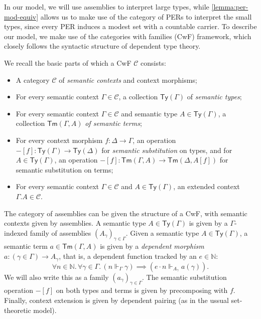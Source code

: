 \documentclass[10pt,a4paper]{article}
\theoremstyle{definition}
\theoremstyle{remark}
\renewcommand{\.}{.\,} %
\renewcommand{\:}{:} %
\newcommand{\bN}{\mathbb{N}}
\newcommand{\C}{\mathcal C}
\newcommand{\0}{\mathbf{0}}
\newcommand{\1}{\mathbf{1}}
\newcommand\<\langle
\renewcommand\>\rangle
\newcommand\bb\mathbb
\newcommand{\Ty}{\mathsf{Ty}}
\newcommand{\Tm}{\mathsf{Tm}}
\theoremstyle{remark}
\begin{document}
In our model, we will use assemblies to interpret large types, while \autoref{lemma:per-mod-equiv} allows us to make use of the category of PERs to interpret the small types, since every PER induces a modest set with a countable carrier. 
To describe our model, we make use of the categories with families (CwF) framework, which closely follows the syntactic structure of dependent type theory.

We recall the basic parts of which a CwF \( \mathcal{C} \) consists:  
\begin{itemize}
    \item A category \( \C \) of \emph{semantic contexts} and context morphisms;
    \item For every semantic context \( \Gamma \in \C \), a collection \( \Ty(\Gamma) \) of \emph{semantic types};
    \item For every semantic context \( \Gamma \in \C \) and semantic type \( A \in \Ty(\Gamma) \), a collection \( \Tm(\Gamma, A) \) \emph{of semantic terms};
    \item For every context morphism $f : \Delta \to \Gamma$, an operation $-[f] : \Ty(\Gamma) \to \Ty(\Delta)$ for \emph{semantic substitution} on types, and for $A \in \Ty(\Gamma)$, an operation $-[f] : \Tm(\Gamma, A) \to \Tm(\Delta, A[f])$ for semantic substitution on terms;
    \item For every semantic context $\Gamma \in \C$ and $A \in \Ty(\Gamma)$, an extended context $\Gamma.A \in \C$. 
\end{itemize}

The category of assemblies can be given the structure of a CwF, with semantic contexts given by assemblies. A semantic type \( A \in \Ty(\Gamma) \) is given by a \( \Gamma \)-indexed family of assemblies \( (A_\gamma)_{\gamma \in \Gamma} \). Given a semantic type \( A \in \Ty(\Gamma) \), a semantic term \( a \in \Tm(\Gamma, A) \) is given by a \emph{dependent morphism} \( a : (\gamma \in \Gamma) \to A_\gamma \), that is, a dependent function tracked by an \(e\in\bb N\): 
\[
    \forall n \in \bN.\,\forall \gamma \in \Gamma \. (n\Vdash_\Gamma \gamma) \implies (e\cdot n\Vdash_{A_\gamma}a(\gamma)).
\]
We will also write this as a family \( (a_\gamma)_{\gamma \in \Gamma} \). The semantic substitution operation $-[f]$ on both types and terms is given by precomposing with $f$. Finally, context extension is given by dependent pairing (as in the ussual set-theoretic model).
\end{document}
